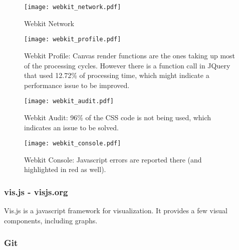       \begin{figure}[ht]
        \begin{center}
          \texttt{[image: webkit\_network.pdf]}
        \end{center}
        \caption{Webkit Network}
        \label{fig:webkit_network}
      \end{figure}

      \begin{figure}[ht]
        \begin{center}
          \texttt{[image: webkit\_profile.pdf]}
        \end{center}
        \caption{Webkit Profile: Canvas render functions are the ones taking up most of the processing cycles. However there is a function call in JQuery that used 12.72\% of processing time, which might indicate a performance issue to be improved.}

        \label{fig:webkit_profile}
      \end{figure}

      \begin{figure}[ht]
        \begin{center}
          \texttt{[image: webkit\_audit.pdf]}
        \end{center}
        \caption{Webkit Audit: 96\% of the CSS code is not being used, which indicates an issue to be solved.}
        \label{fig:webkit_audit}
      \end{figure}

      \begin{figure}[ht]
        \begin{center}
          \texttt{[image: webkit\_console.pdf]}
        \end{center}
        \caption{Webkit Console: Javascript errors are reported there (and highlighted in red as well).}
        \label{fig:webkit_console}
      \end{figure}

      \clearpage

    \subsubsection{vis.js - visjs.org} %
    \label{ssub:visjs}
      Vis.js is a javascript framework for visualization.
      It provides a few visual components, including graphs.


    \subsubsection{Git} %
    \label{ssub:git}
    

